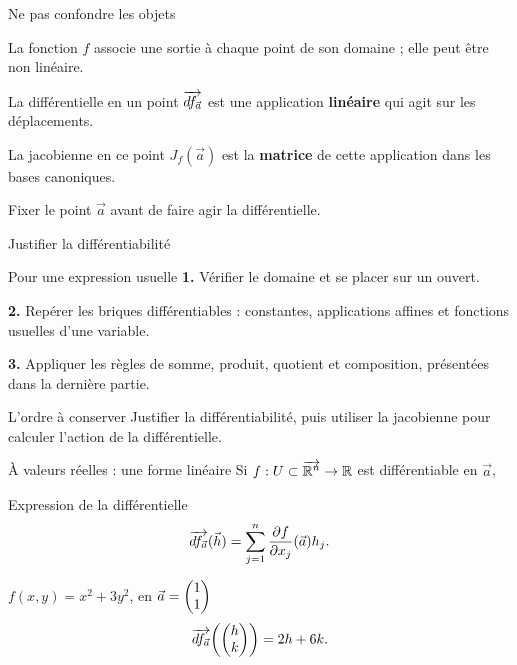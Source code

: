 \begin{frame}[t]{Ne pas confondre les objets}
\coursanalyse
\begin{cours}{La fonction}
$f$ associe une sortie à chaque point de son domaine ; elle peut être non linéaire.
\end{cours}
\begin{cours}{La différentielle en un point}
$\overrightarrow{df_{\vec a}}$ est une application \textbf{linéaire} qui agit sur les déplacements.
\end{cours}
\begin{cours}{La jacobienne en ce point}
$J_f(\vec a)$ est la \textbf{matrice} de cette application dans les bases canoniques.
\end{cours}
\vfill Fixer le point $\vec a$ avant de faire agir la différentielle.
\end{frame}

\begin{frame}[t]{Justifier la différentiabilité}
\coursanalyse
\begin{cours}{Pour une expression usuelle}
\textbf{1.} Vérifier le domaine et se placer sur un ouvert.

\medskip
\textbf{2.} Repérer les briques différentiables : constantes, applications affines et fonctions usuelles d'une variable.

\medskip
\textbf{3.} Appliquer les règles de somme, produit, quotient et composition, présentées dans la dernière partie.
\end{cours}
\begin{resultat}{L'ordre à conserver}
Justifier la différentiabilité, puis utiliser la jacobienne pour calculer l'action de la différentielle.
\end{resultat}
\end{frame}

\begin{frame}[t]{À valeurs réelles : une forme linéaire}
\coursanalyse
Si $f:U\subset\overrightarrow{\mathbb R^{n}}\to\mathbb R$ est différentiable en $\vec a$,
\begin{theoreme}{Expression de la différentielle}
\[\overrightarrow{df_{\vec a}}(\vec h)=\sum_{j=1}^n\frac{\partial f}{\partial x_j}(\vec a)h_j.\]
\end{theoreme}
\begin{exemple}{$f(x,y)=x^2+3y^2$, en $\vec a=\begin{pmatrix}1\\1\end{pmatrix}$}
\[\overrightarrow{df_{\vec a}}\!\left(\begin{pmatrix}h\\k\end{pmatrix}\right)=2h+6k.\]
\end{exemple}

\end{frame}

